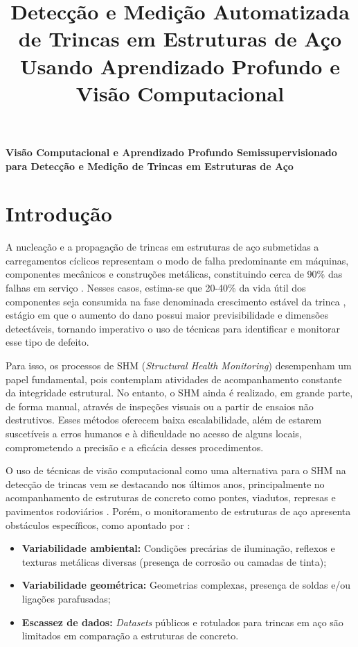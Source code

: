 \documentclass[12pt]{article}
\title {Detecção e Medição Automatizada de Trincas em Estruturas de Aço Usando Aprendizado Profundo e Visão Computacional}
\begin{document}
\begin{center}
\Large\bfseries
Visão Computacional e Aprendizado Profundo Semissupervisionado para Detecção e Medição de Trincas em Estruturas de Aço
\end{center}

\section{Introdução}

A nucleação e a propagação de trincas em estruturas de aço submetidas a carregamentos cíclicos representam o modo de falha predominante em máquinas, componentes mecânicos e construções metálicas, constituindo cerca de 90\% das falhas em serviço \cite{1hosford2010solid}. Nesses casos, estima-se que 20-40\% da vida útil dos componentes seja consumida na fase denominada crescimento estável da trinca \cite{2newman1998merging}, estágio em que o aumento do dano possui maior previsibilidade e dimensões detectáveis, tornando imperativo o uso de técnicas para identificar e monitorar esse tipo de defeito. 

Para isso, os processos de SHM (\textit{Structural Health Monitoring}) desempenham um papel fundamental, pois contemplam atividades de acompanhamento constante da integridade estrutural. No entanto, o SHM ainda é realizado, em grande parte, de forma manual, através de inspeções visuais ou a partir de ensaios não destrutivos. Esses métodos oferecem baixa escalabilidade, além de estarem suscetíveis a erros humanos e à dificuldade no acesso de alguns locais, comprometendo a precisão e a eficácia desses procedimentos.

O uso de técnicas de visão computacional como uma alternativa para o SHM na detecção de trincas vem se destacando nos últimos anos, principalmente no acompanhamento de estruturas de concreto como pontes, viadutos, represas e pavimentos rodoviários \cite{14konig2022s}. Porém, o monitoramento de estruturas de aço apresenta obstáculos específicos, como apontado por \textcite{12li2021deep}:
\begin{itemize}
    \item \textbf{Variabilidade ambiental:} Condições precárias de iluminação, reflexos e texturas metálicas diversas (presença de corrosão ou camadas de tinta);
    \item \textbf{Variabilidade geométrica:} Geometrias complexas, presença de soldas e/ou ligações parafusadas;
    \item \textbf{Escassez de dados:} \textit{Datasets} públicos e rotulados para trincas em aço são limitados em comparação a estruturas de concreto.
\end{itemize}
\end{document}
